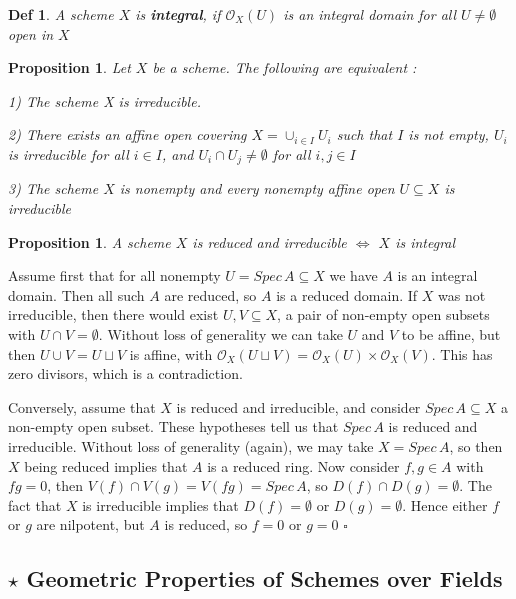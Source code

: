 \documentclass{article}
\newtheorem{definition}[theorem]{Def}
\newtheorem{proposition}[theorem]{Proposition}
\newenvironment{Proof}{{\noindent \indent \it Proof:\quad}}{\hfill $\square$\par}
\begin{document}
\begin{definition}
    A scheme $X$ is \textbf{integral}, if $\mathcal O_X(U)$ is an integral domain for all $U \ne \emptyset$ open in $X$
\end{definition}

\begin{proposition}
    Let $X$ be a scheme. The following are equivalent :

1) The scheme X is irreducible.

2) There exists an affine open covering $X=\cup_{i\in I}U_i$ such that $I$ is not empty, $U_i$ is irreducible for all $i\in I$, and $U_i \cap U_j \ne \emptyset$ for all $i,j\in I$

3) The scheme $X$ is nonempty and every nonempty affine open $U \subseteq X$ is irreducible
\end{proposition}

\begin{proposition}
    A scheme $X$ is reduced and irreducible $\Leftrightarrow$ $X$ is integral
\end{proposition}
\begin{Proof}
    Assume first that for all nonempty $U = Spec\, A \subseteq X$ we have $A$ is an integral domain. Then all such $A$ are reduced, so $A$ is a reduced domain. If $X$ was not irreducible, then there would exist $U, V \subseteq X$, a pair of non-empty open subsets with $U \cap V = \emptyset$. Without loss of generality we can take $U$ and $V$ to be affine, but then $U \cup V = U \sqcup V$ is affine, with $\mathcal O_X(U \sqcup V) = \mathcal O_X(U)\times \mathcal O_X(V)$. This has zero divisors, which is a contradiction.
    
Conversely, assume that $X$ is reduced and irreducible, and consider
$Spec\, A \subseteq X$ a non-empty open subset. These hypotheses tell us that $Spec\, A$ is reduced and irreducible.
Without loss of generality (again), we may take $X = Spec\, A$, so then $X$ being reduced implies that
$A$ is a reduced ring. Now consider $f, g \in A$ with $fg = 0$, then $V (f) \cap V (g) = V (fg) = Spec\, A$, so
$D(f) \cap D(g) = \emptyset$. The fact that $X$ is irreducible implies that $D(f) = \emptyset$ or $D(g) = \emptyset$. Hence either $f$ or $g$ are nilpotent, but $A$ is reduced, so $f = 0$ or $g = 0$
\end{Proof}







\newpage
\subsection{$\star$ Geometric Properties of Schemes over Fields}
\end{document}
